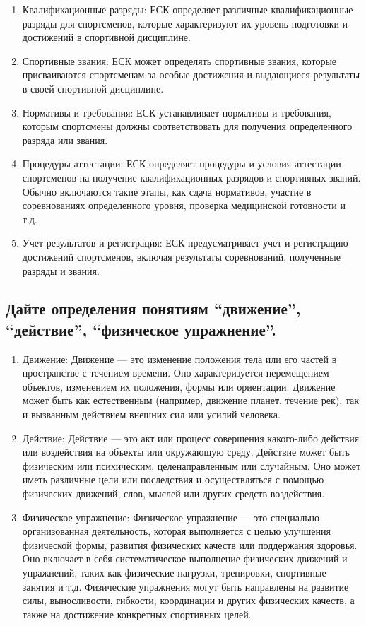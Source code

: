 \begin{enumerate}
    \item Квалификационные разряды: ЕСК определяет различные квалификационные разряды для спортсменов, которые характеризуют их уровень подготовки и достижений в спортивной дисциплине.
    \item Спортивные звания: ЕСК может определять спортивные звания, которые присваиваются спортсменам за особые достижения и выдающиеся результаты в своей спортивной дисциплине.
    \item Нормативы и требования: ЕСК устанавливает нормативы и требования, которым спортсмены должны соответствовать для получения определенного разряда или звания.
    \item Процедуры аттестации: ЕСК определяет процедуры и условия аттестации спортсменов на получение квалификационных разрядов и спортивных званий. Обычно включаются такие этапы, как сдача нормативов, участие в соревнованиях определенного уровня, проверка медицинской готовности и т.д.
    \item Учет результатов и регистрация: ЕСК предусматривает учет и регистрацию достижений спортсменов, включая результаты соревнований, полученные разряды и звания.
\end{enumerate}

\subsection{Дайте определения понятиям ``движение'', ``действие'', ``физическое упражнение''.}

\begin{enumerate}
    \item Движение: Движение — это изменение положения тела или его частей в пространстве с течением времени. Оно характеризуется перемещением объектов, изменением их положения, формы или ориентации. Движение может быть как естественным (например, движение планет, течение рек), так и вызванным действием внешних сил или усилий человека.
    \item Действие: Действие — это акт или процесс совершения какого-либо действия или воздействия на объекты или окружающую среду. Действие может быть физическим или психическим, целенаправленным или случайным. Оно может иметь различные цели или последствия и осуществляться с помощью физических движений, слов, мыслей или других средств воздействия.
    \item Физическое упражнение: Физическое упражнение — это специально организованная деятельность, которая выполняется с целью улучшения физической формы, развития физических качеств или поддержания здоровья. Оно включает в себя систематическое выполнение физических движений и упражнений, таких как физические нагрузки, тренировки, спортивные занятия и т.д. Физические упражнения могут быть направлены на развитие силы, выносливости, гибкости, координации и других физических качеств, а также на достижение конкретных спортивных целей.
\end{enumerate}

